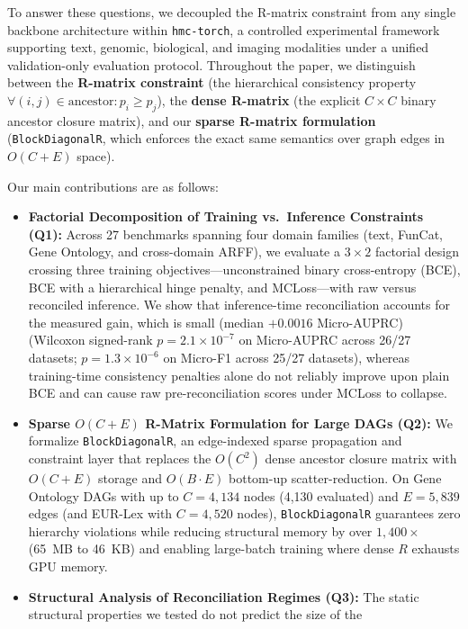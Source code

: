 \documentclass[preprint,12pt]{elsarticle}
\begin{document}
To answer these questions, we decoupled the R-matrix constraint
from any single backbone architecture within \texttt{hmc-torch}, a controlled
experimental framework supporting text, genomic, biological, and imaging
modalities under a unified validation-only evaluation protocol. Throughout the
paper, we distinguish between the \textbf{R-matrix constraint} (the
hierarchical consistency property $\forall (i,j) \in \text{ancestor}: p_i \geq
p_j$), the \textbf{dense R-matrix} (the explicit $C \times C$ binary ancestor
closure matrix), and our \textbf{sparse R-matrix formulation}
(\texttt{BlockDiagonalR}, which enforces the exact same semantics over graph
edges in $O(C{+}E)$ space).

Our main contributions are as follows:
\begin{itemize}[leftmargin=*,nosep]
  \item \textbf{Factorial Decomposition of Training vs.\ Inference Constraints
    (Q1):} Across 27 benchmarks spanning four domain families (text, FunCat,
    Gene Ontology, and cross-domain ARFF), we evaluate a $3 \times 2$
    factorial design crossing three training objectives---unconstrained binary
    cross-entropy (BCE), BCE with a hierarchical hinge penalty, and
    MCLoss---with raw versus reconciled inference. We show that
    inference-time reconciliation accounts for the measured gain, which is
    small (median $+0.0016$ Micro-AUPRC)
    (Wilcoxon signed-rank $p = 2.1\times 10^{-7}$ on Micro-AUPRC across 26/27
    datasets; $p = 1.3\times 10^{-6}$ on Micro-F1 across 25/27 datasets),
    whereas training-time consistency penalties alone do not reliably improve
    upon plain BCE and can cause raw pre-reconciliation scores under MCLoss to
    collapse.
  \item \textbf{Sparse $O(C{+}E)$ R-Matrix Formulation for Large DAGs (Q2):}
    We formalize \texttt{BlockDiagonalR}, an edge-indexed sparse propagation
    and constraint layer that replaces the $O(C^2)$ dense ancestor closure
    matrix with $O(C{+}E)$ storage and $O(B \cdot E)$ bottom-up
    scatter-reduction. On Gene Ontology DAGs with up to $C{=}4{,}134$ nodes
    (4,130 evaluated) and $E{=}5{,}839$ edges (and EUR-Lex with $C{=}4{,}520$ nodes),
    \texttt{BlockDiagonalR} guarantees zero hierarchy violations while reducing
    structural memory by over $1{,}400\times$ (65~MB to 46~KB) and enabling
    large-batch training where dense $R$ exhausts GPU memory.
  \item \textbf{Structural Analysis of Reconciliation Regimes (Q3):} The
    static structural properties we tested do not predict the size of the

\end{itemize}
\end{document}
